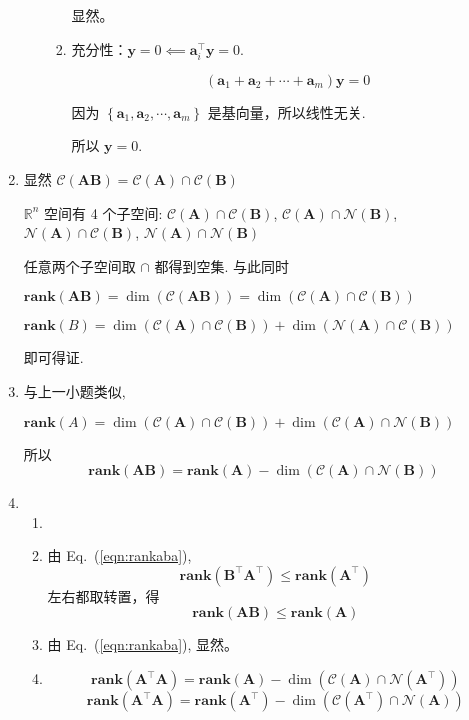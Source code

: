 \documentclass[11pt,letter,notitlepage]{article}
\renewcommand{\eqref}[1]{Eq.~(\ref{#1})}
\newcommand{\rank}[1]{ \textbf{rank}  (#1)  }
\begin{document}
\begin{solution}
\begin{enumerate}
\begin{enumerate}
\begin{enumerate}
                                  显然。

                            \item 充分性：$\mathbf{y}=0 \impliedby \mathbf{a}_i^\top \mathbf{y}=0$.

                                  $$(\mathbf{a}_1+\mathbf{a}_2+\cdots+\mathbf{a}_m)\mathbf{y}=0$$

                                  因为 $\left\{\mathbf{a}_1, \mathbf{a}_2,\cdots,\mathbf{a}_m\right\}$ 是基向量，所以线性无关.

                                  所以 $\mathbf{y}=0$.
                        \end{enumerate}
              \end{enumerate}
        \item 显然 $\mathcal{C}(\mathbf{AB})=\mathcal{C}(\mathbf{A})\cap\mathcal{C}(\mathbf{B})$

              $\mathbb{R}^n$ 空间有 4 个子空间: $\mathcal{C}(\mathbf{A})\cap\mathcal{C}(\mathbf{B})$, $\mathcal{C}(\mathbf{A})\cap\mathcal{N}(\mathbf{B})$, $\mathcal{N}(\mathbf{A})\cap\mathcal{C}(\mathbf{B})$, $\mathcal{N}(\mathbf{A})\cap\mathcal{N}(\mathbf{B})$

              任意两个子空间取 $\cap$ 都得到空集. 与此同时

              $\rank{\mathbf{AB}}=\dim(\mathcal{C}(\mathbf{AB}))=\dim(\mathcal{C}(\mathbf{A})\cap\mathcal{C}(\mathbf{B}))$

              $\rank{B} = \dim(\mathcal{C}(\mathbf{A})\cap\mathcal{C}(\mathbf{B}))+\dim(\mathcal{N}(\mathbf{A})\cap\mathcal{C}(\mathbf{B}))$

              即可得证.
        \item 与上一小题类似,

              $\rank{A} = \dim(\mathcal{C}(\mathbf{A})\cap\mathcal{C}(\mathbf{B}))+\dim(\mathcal{C}(\mathbf{A})\cap\mathcal{N}(\mathbf{B}))$

              所以 $$\rank{\mathbf{A}\mathbf{B}}=\rank{\mathbf{A}}-\dim(\mathcal{C}(\mathbf{A}) \cap \mathcal{N}(\mathbf{B}))$$
        \item \begin{enumerate}
                  \item 
                  \item 由 \eqref{eqn:rankaba},
                        $$\rank{\mathbf{B}^\top\mathbf{A}^\top}\leq\rank{\mathbf{A}^\top}$$
                        左右都取转置，得
                        $$\rank{\mathbf{A}\mathbf{B}}\leq\rank{\mathbf{A}}$$
                  \item 由 \eqref{eqn:rankaba}, 显然。
                  \item $$\rank{\mathbf{A}^\top\mathbf{A}}=\rank{\mathbf{A}}-\dim(\mathcal{C}(\mathbf{A}) \cap \mathcal{N}(\mathbf{A}^\top))$$
                  $$\rank{\mathbf{A}^\top\mathbf{A}}=\rank{\mathbf{A}^\top}-\dim(\mathcal{C}(\mathbf{A}^\top) \cap \mathcal{N}(\mathbf{A}))$$

              \end{enumerate}
    \end{enumerate}
\end{solution}
\end{document}
